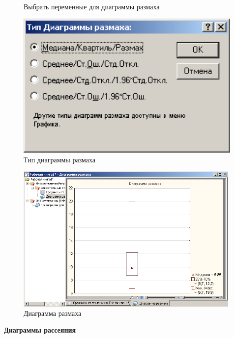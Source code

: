 \begin{figure}[!h]
\begin{minipage}{0.32\textwidth}
    \caption{Выбрать переменные для диаграммы размаха}
    \label{fig:var5__12}
  \end{minipage}
  \begin{minipage}{0.32\textwidth}
    \centering

    \includegraphics[width=0.99\textwidth]
    {inc/var5__13.PNG}

    \caption{Тип диаграммы размаха}
    \label{fig:var5__13}
  \end{minipage}
\end{figure}

\begin{figure}[!h]
  \centering

  \includegraphics[width=11cm]
  {inc/var5__14.PNG}

  \caption{Диаграмма размаха}

  \label{fig:var5__14}
\end{figure}

\newpage

\begin{center}
  \textbf{Диаграммы рассеяния}
\end{center}

